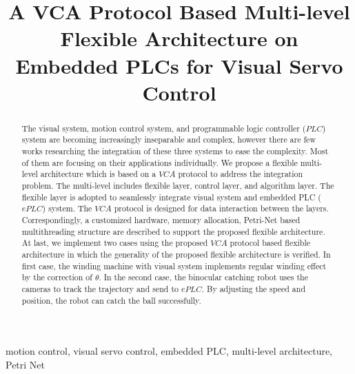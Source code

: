 \documentclass[journal,UTF8]{IEEEtran}
\begin{document}
%
\title{A VCA Protocol Based Multi-level Flexible Architecture on Embedded PLCs for Visual Servo Control }

\maketitle

\begin{abstract}
The visual system, motion control system, and programmable logic controller ($PLC$) system are becoming increasingly inseparable and complex, however there are few works researching the integration of these three systems to ease the complexity. Most of them are focusing on their applications individually. We propose a flexible multi-level architecture which is based on a $VCA$ protocol to address the integration problem. The multi-level includes flexible layer, control layer, and algorithm layer. The flexible layer is adopted to seamlessly integrate visual system and embedded PLC ($ePLC$) system. The $VCA$ protocol is designed for data interaction between the layers. Correspondingly, a customized hardware, memory allocation, Petri-Net based multithreading structure are described to support the proposed flexible architecture. At last, we implement two cases using the proposed $VCA$ protocol based flexible architecture in which the generality of the proposed flexible architecture is verified. In first case, the winding machine with visual system implements regular winding effect by the correction of $\theta$. In the second case, the binocular catching robot uses the cameras to track the trajectory and send to $ePLC$. By adjusting the speed and position, the robot can catch the ball successfully.
\end{abstract}

\begin{IEEEkeywords}
motion control, visual servo control, embedded PLC, multi-level architecture, Petri Net
\end{IEEEkeywords}

%
\IEEEpeerreviewmaketitle
\end{document}
